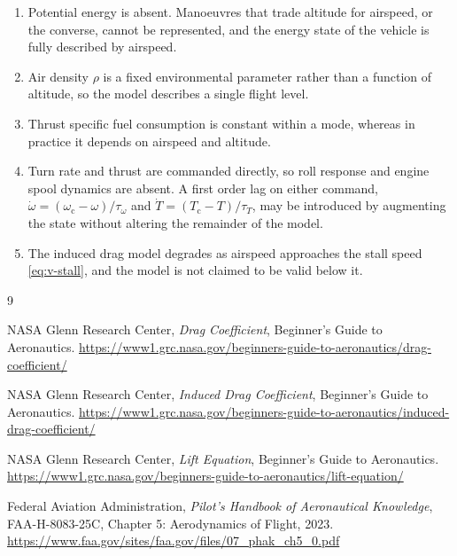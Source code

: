 \documentclass[11pt,a4paper]{article}
\begin{document}
\begin{enumerate}
  \item Potential energy is absent. Manoeuvres that trade altitude for airspeed,
        or the converse, cannot be represented, and the energy state of the
        vehicle is fully described by airspeed.
  \item Air density $\rho$ is a fixed environmental parameter rather than a
        function of altitude, so the model describes a single flight level.
  \item Thrust specific fuel consumption is constant within a mode, whereas in
        practice it depends on airspeed and altitude.
  \item Turn rate and thrust are commanded directly, so roll response and engine
        spool dynamics are absent. A first order lag on either command,
        $\dot\omega = (\omega_{\mathrm{c}} - \omega)/\tau_\omega$ and
        $\dot T = (T_{\mathrm{c}} - T)/\tau_T$, may be introduced by augmenting
        the state without altering the remainder of the model.
  \item The induced drag model degrades as airspeed approaches the stall speed
        \cref{eq:v-stall}, and the model is not claimed to be valid below it.
\end{enumerate}

\begin{thebibliography}{9}

NASA Glenn Research Center,
\emph{Drag Coefficient}, Beginner's Guide to Aeronautics.
\url{https://www1.grc.nasa.gov/beginners-guide-to-aeronautics/drag-coefficient/}

NASA Glenn Research Center,
\emph{Induced Drag Coefficient}, Beginner's Guide to Aeronautics.
\url{https://www1.grc.nasa.gov/beginners-guide-to-aeronautics/induced-drag-coefficient/}

NASA Glenn Research Center,
\emph{Lift Equation}, Beginner's Guide to Aeronautics.
\url{https://www1.grc.nasa.gov/beginners-guide-to-aeronautics/lift-equation/}

Federal Aviation Administration,
\emph{Pilot's Handbook of Aeronautical Knowledge}, FAA-H-8083-25C,
Chapter 5: Aerodynamics of Flight, 2023.
\url{https://www.faa.gov/sites/faa.gov/files/07_phak_ch5_0.pdf}

\end{thebibliography}
\end{document}
